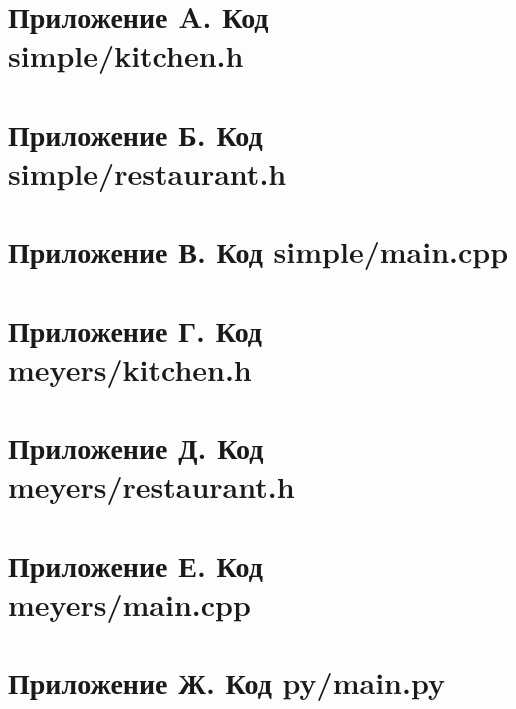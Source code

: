 \setcounter{secnumdepth}{-1}

\section{Приложение A. Код simple/kitchen.h}

\newpage

\section{Приложение Б. Код simple/restaurant.h}

\newpage

\section{Приложение В. Код simple/main.cpp}

\newpage

\section{Приложение Г. Код meyers/kitchen.h}

\newpage

\section{Приложение Д. Код meyers/restaurant.h}

\newpage

\section{Приложение Е. Код meyers/main.cpp}

\newpage

\section{Приложение Ж. Код py/main.py}

\newpage
